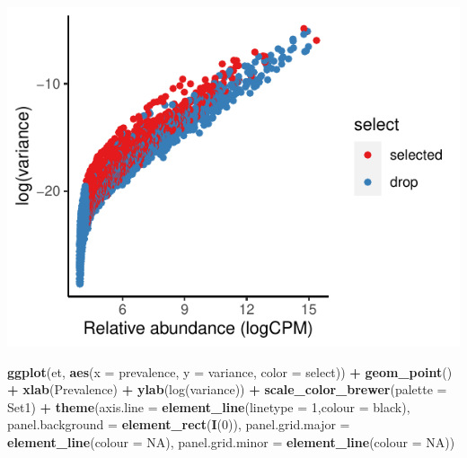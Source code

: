 \documentclass[
]{article}
\newenvironment{Shaded}{\begin{snugshade}}{\end{snugshade}}
\newcommand{\AttributeTok}[1]{\textcolor[rgb]{0.13,0.29,0.53}{#1}}
\newcommand{\ConstantTok}[1]{\textcolor[rgb]{0.56,0.35,0.01}{#1}}
\newcommand{\DecValTok}[1]{\textcolor[rgb]{0.00,0.00,0.81}{#1}}
\newcommand{\FunctionTok}[1]{\textcolor[rgb]{0.13,0.29,0.53}{\textbf{#1}}}
\newcommand{\NormalTok}[1]{#1}
\newcommand{\SpecialCharTok}[1]{\textcolor[rgb]{0.81,0.36,0.00}{\textbf{#1}}}
\newcommand{\StringTok}[1]{\textcolor[rgb]{0.31,0.60,0.02}{#1}}
\begin{document}
\includegraphics{workshop_files/figure-latex/unnamed-chunk-51-5.pdf}

\begin{Shaded}
\begin{Highlighting}[]

\FunctionTok{ggplot}\NormalTok{(et, }\FunctionTok{aes}\NormalTok{(}\AttributeTok{x =}\NormalTok{ prevalence, }\AttributeTok{y =}\NormalTok{ variance, }\AttributeTok{color =}\NormalTok{ select)) }\SpecialCharTok{+} \FunctionTok{geom\_point}\NormalTok{() }\SpecialCharTok{+}
  \FunctionTok{xlab}\NormalTok{(}\StringTok{\textquotesingle{}Prevalence\textquotesingle{}}\NormalTok{) }\SpecialCharTok{+} \FunctionTok{ylab}\NormalTok{(}\StringTok{\textquotesingle{}log(variance)\textquotesingle{}}\NormalTok{) }\SpecialCharTok{+}
  \FunctionTok{scale\_color\_brewer}\NormalTok{(}\AttributeTok{palette =} \StringTok{\textquotesingle{}Set1\textquotesingle{}}\NormalTok{) }\SpecialCharTok{+}
  \FunctionTok{theme}\NormalTok{(}\AttributeTok{axis.line =} \FunctionTok{element\_line}\NormalTok{(}\AttributeTok{linetype =} \DecValTok{1}\NormalTok{,}\AttributeTok{colour =} \StringTok{\textquotesingle{}black\textquotesingle{}}\NormalTok{),}
        \AttributeTok{panel.background =} \FunctionTok{element\_rect}\NormalTok{(}\FunctionTok{I}\NormalTok{(}\DecValTok{0}\NormalTok{)),}
        \AttributeTok{panel.grid.major =} \FunctionTok{element\_line}\NormalTok{(}\AttributeTok{colour =} \ConstantTok{NA}\NormalTok{),}
        \AttributeTok{panel.grid.minor =} \FunctionTok{element\_line}\NormalTok{(}\AttributeTok{colour =} \ConstantTok{NA}\NormalTok{))}
\end{Highlighting}
\end{Shaded}
\end{document}
